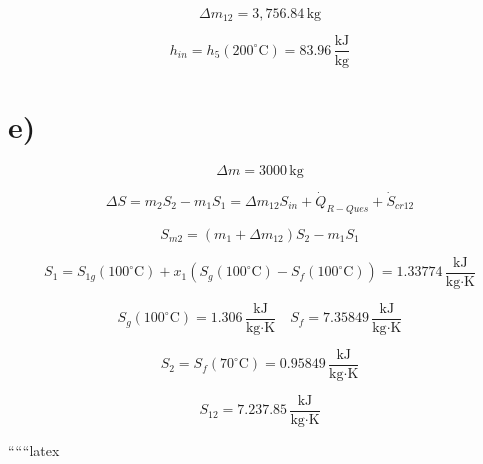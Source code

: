 \[
\Delta m_{12} = 3,756.84 \, \text{kg}
\]

\[
h_{in} = h_5 (200^\circ \text{C}) = 83.96 \, \frac{\text{kJ}}{\text{kg}}
\]

\section*{e)}

\[
\Delta m = 3000 \, \text{kg}
\]

\[
\Delta S = m_2 S_2 - m_1 S_1 = \Delta m_{12} S_{in} + \dot{Q}_{R-Ques} + \dot{S}_{cr12}
\]

\[
S_{m2} = (m_1 + \Delta m_{12}) S_2 - m_1 S_1
\]

\[
S_1 = S_{1g} (100^\circ \text{C}) + x_1 (S_g (100^\circ \text{C}) - S_f (100^\circ \text{C})) = 1.33774 \, \frac{\text{kJ}}{\text{kg} \cdot \text{K}}
\]

\[
S_g (100^\circ \text{C}) = 1.306 \, \frac{\text{kJ}}{\text{kg} \cdot \text{K}} \quad S_f = 7.35849 \, \frac{\text{kJ}}{\text{kg} \cdot \text{K}}
\]

\[
S_2 = S_f (70^\circ \text{C}) = 0.95849 \, \frac{\text{kJ}}{\text{kg} \cdot \text{K}}
\]

\[
S_{12} = 7.237.85 \, \frac{\text{kJ}}{\text{kg} \cdot \text{K}}
\]

``````latex


